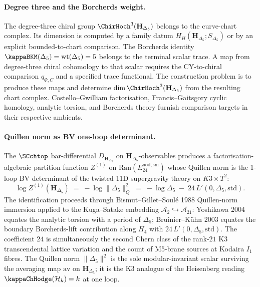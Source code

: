 \paragraph{Degree three and the Borcherds weight.}
The degree-three chiral group
$\ChirHoch^3(\mathbf H_{\Delta_5})$ belongs to the curve-chart
complex.  Its dimension is computed by a family datum
$H_H(\mathbf H_{\Delta_5};S_{\Delta_5})$ or by an explicit
bounded-to-chart comparison.  The Borcherds identity
$\kappaBKM(\Delta_5)=\mathrm{wt}(\Delta_5)=5$ belongs to the
terminal scalar trace.  A map from degree-three chiral cohomology to
that scalar requires the CY-to-chiral comparison $q_{\Phi,C}$ and a
specified trace functional.  The construction problem is to produce
these maps and determine
$\dim\ChirHoch^3(\mathbf H_{\Delta_5})$ from the resulting chart
complex.  Costello--Gwilliam factorisation, Francis--Gaitsgory cyclic
homology, analytic torsion, and Borcherds theory furnish comparison
targets in their respective ambients.

\paragraph{Quillen norm as BV one-loop determinant.}
The $\SCchtop$ bar-differential $D_{\mathbf{H}_{\Delta_5}}$ on
$\mathbf{H}_{\Delta_5}$-observables produces a factorisation-algebraic
partition function $Z^{(1)}$ on $\mathrm{Ran}(E^{\mathrm{nod,sm}}_{24})$
whose Quillen norm is the 1-loop BV determinant of the twisted 11D
supergravity theory on $K3\times T^2$:
\[
\log Z^{(1)}(\mathbf{H}_{\Delta_5})
\;=\;
-\log\|\Delta_5\|_Q^2
\;=\;
-\log\Delta_5
\;-\;
24\,L'(0,\Delta_5,\mathrm{std}).
\]
The identification proceeds through Bismut--Gillet--Soulé 1988
Quillen-norm immersion applied to the Kuga--Satake embedding
$\overline{\mathcal{A}_2}\hookrightarrow\overline{\mathcal{A}_{21}}$:
Yoshikawa 2004 equates the analytic torsion with a period of
$\Delta_5$; Bruinier--Kühn 2003 equates the boundary Borcherds-lift
contribution along $H_4$ with $24\,L'(0,\Delta_5,\mathrm{std})$. The
coefficient $24$ is simultaneously the second Chern class of the
rank-$21$ K3 transcendental lattice variation and the count of
M5-brane sources at Kodaira $I_1$ fibres. The Quillen norm
$\|\Delta_5\|^2$ is the sole modular-invariant scalar surviving the
averaging map $\mathrm{av}$ on $\mathbf{H}_{\Delta_5}$; it is the K3
analogue of the Heisenberg reading
$\kappaChHodge(\cH_k) = k$ at one loop.

